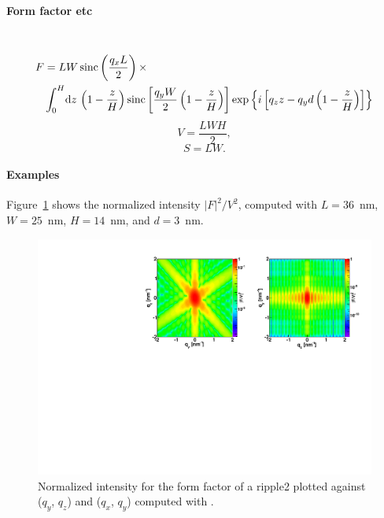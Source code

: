 \paragraph{Form factor etc}\strut\\
\begin{align*}
F &=L W
\operatorname{sinc}\left(\frac{q_xL}{2}\right)\times \\ &
\int_0^H \!\text{d} z\,
\left(1-\frac{z}{H}\right)
 \operatorname{sinc}\left[\frac{q_y
    W}{2}\left(1-\frac{z}{H}\right)\right] 
\exp\left\{ i\left[q_zz -
    q_yd\left(1-\frac{z}{H}\right)\right]\right\}
\end{align*}
\begin{equation*}
  V = \dfrac{L W H}{2},
\end{equation*}
\begin{equation*}
  S = L W.
\end{equation*}

\paragraph{Examples}
Figure~\ref{fig:FFripple2Ex} shows the normalized intensity
$|F|^2/V^2$, computed with $L=36$~nm, $W=25$~nm, $H=14$~nm, and $d=3$~nm.

\begin{figure}[H]
\begin{center}
\includegraphics[angle=-90,width=\textwidth]{fig/ff/figffripple2.pdf}
\end{center}
\caption{Normalized intensity for the form factor of a ripple2 plotted against ($q_y$, $q_z$) and  ($q_x$, $q_y$)
  computed with .}
\label{fig:FFripple2Ex}
\end{figure}

